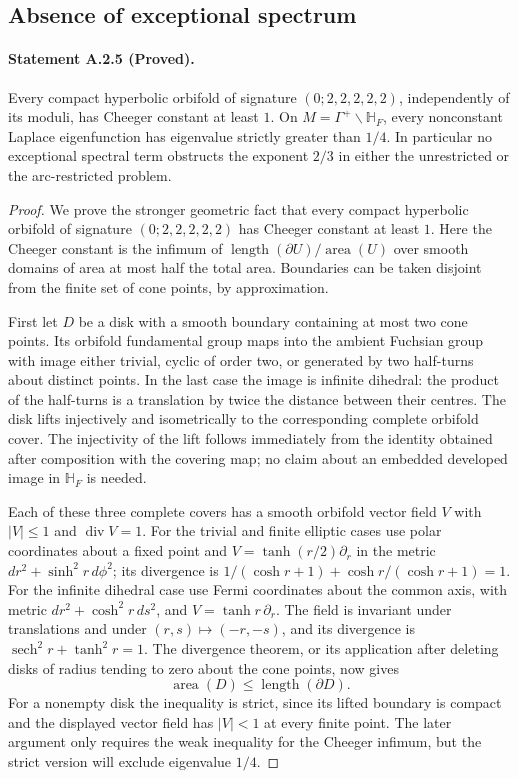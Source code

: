\subsection{Absence of exceptional spectrum}
\paragraph{Statement A.2.5 (Proved).}
Every compact hyperbolic orbifold of signature $(0;2,2,2,2,2)$,
independently of its moduli, has Cheeger constant at least $1$.
On $M=\Gamma^+\backslash\mathbb H_F$, every nonconstant Laplace
eigenfunction has eigenvalue strictly greater than $1/4$. In particular no
exceptional spectral term obstructs the exponent $2/3$ in either
the unrestricted or the arc-restricted problem.
\begin{proof}
We prove the stronger geometric fact that every compact hyperbolic
orbifold of signature $(0;2,2,2,2,2)$ has Cheeger constant at least $1$.
Here the Cheeger constant is the infimum of
$\operatorname{length}(\partial U)/\operatorname{area}(U)$ over
smooth domains of area at most half the total area. Boundaries can be
taken disjoint from the finite set of cone points, by approximation.

First let $D$ be a disk with a smooth boundary containing at most two
cone points. Its orbifold fundamental group maps into the ambient
Fuchsian group with image either trivial, cyclic of order two, or
generated by two half-turns about distinct points. In the last case
the image is infinite dihedral: the product of the half-turns is a
translation by twice the distance between their centres. The disk
lifts injectively and isometrically to the corresponding complete
orbifold cover. The injectivity of the lift follows immediately from
the identity obtained after composition with the covering map; no
claim about an embedded developed image in $\mathbb H_F$ is needed.

Each of these three complete covers has a smooth orbifold vector
field $V$ with $|V|\leq1$ and $\operatorname{div}V=1$.
For the trivial and finite elliptic cases use polar coordinates about
a fixed point and
$V=\tanh(r/2)\partial_r$ in the metric
$dr^2+\sinh^2r\,d\phi^2$; its divergence is
$1/(\cosh r+1)+\cosh r/(\cosh r+1)=1$.
For the infinite dihedral case use Fermi coordinates about the common
axis, with metric $dr^2+\cosh^2r\,ds^2$, and
$V=\tanh r\,\partial_r$. The field is invariant under translations
and under $(r,s)\mapsto(-r,-s)$, and its divergence is
$\operatorname{sech}^2r+\tanh^2r=1$.
The divergence theorem, or its application after deleting disks of
radius tending to zero about the cone points, now gives
\begin{equation}\label{A:disk-isoperimetry}
 \operatorname{area}(D)\leq\operatorname{length}(\partial D).
\end{equation}
For a nonempty disk the inequality is strict, since its lifted boundary
is compact and the displayed vector field has $|V|<1$ at every finite
point. The later argument only requires the weak inequality for the
Cheeger infimum, but the strict version will exclude eigenvalue $1/4$.



\end{proof}
